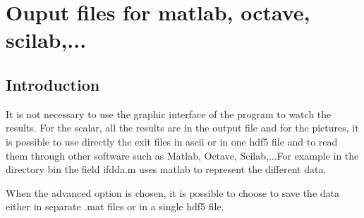 \chapter{Ouput files for matlab, octave,
  scilab,...}\label{chap7}

\minitoc

\section{Introduction}

It is not necessary to use the graphic interface of the program to
watch the results. For the scalar, all the results are in the output
file and for the pictures, it is possible to use directly the exit
files in ascii or in one hdf5 file and to read them through other
software such as Matlab, Octave, Scilab,...For example in the
directory bin the field ifdda.m uses matlab to represent the different
data.


When the advanced option is chosen, it is possible to choose to save
the data either in separate .mat files or in a single hdf5 file.

